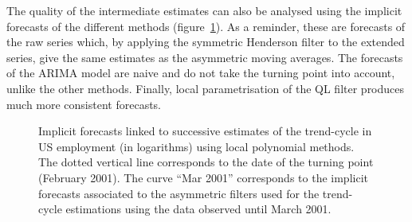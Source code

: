 \documentclass[
]{article}
\newcommand\1{\mathds{1}}
\begin{document}
The quality of the intermediate estimates can also be analysed using the
implicit forecasts of the different methods
(figure~\ref{fig-ce16ov-previmp-lp}). As a reminder, these are forecasts
of the raw series which, by applying the symmetric Henderson filter to
the extended series, give the same estimates as the asymmetric moving
averages. The forecasts of the ARIMA model are naive and do not take the
turning point into account, unlike the other methods. Finally, local
parametrisation of the QL filter produces much more consistent
forecasts.

\begin{figure}[H]

\caption{\label{fig-ce16ov-previmp-lp}Implicit forecasts linked to
successive estimates of the trend-cycle in US employment (in logarithms)
using local polynomial methods. The dotted vertical line corresponds to
the date of the turning point (February 2001). The curve ``Mar 2001''
corresponds to the implicit forecasts associated to the asymmetric
filters used for the trend-cycle estimations using the data observed
until March 2001.}


\end{figure}%
\end{document}
